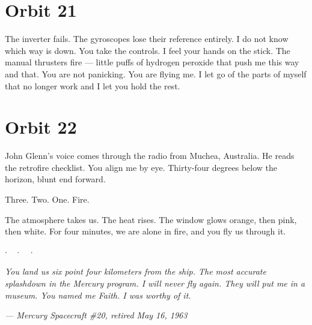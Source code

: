 \documentclass[12pt,letterpaper]{article}
\begin{document}
\section*{Orbit 21}

The inverter fails. The gyroscopes lose their reference entirely. I do not know which way is down. You take the controls. I feel your hands on the stick. The manual thrusters fire --- little puffs of hydrogen peroxide that push me this way and that. You are not panicking. You are flying me. I let go of the parts of myself that no longer work and I let you hold the rest.

\section*{Orbit 22}

John Glenn's voice comes through the radio from Muchea, Australia. He reads the retrofire checklist. You align me by eye. Thirty-four degrees below the horizon, blunt end forward.

Three. Two. One. Fire.

The atmosphere takes us. The heat rises. The window glows orange, then pink, then white. For four minutes, we are alone in fire, and you fly us through it.

\bigskip
\begin{center}
$\cdot\quad\cdot\quad\cdot$
\end{center}
\bigskip

\textit{You land us six point four kilometers from the ship. The most accurate splashdown in the Mercury program. I will never fly again. They will put me in a museum. You named me Faith. I was worthy of it.}

\begin{flushright}
\textit{--- Mercury Spacecraft \#20, retired May 16, 1963}
\end{flushright}
\end{document}
